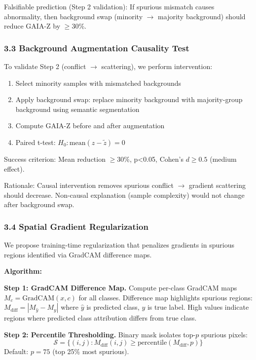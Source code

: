 Falsifiable prediction (Step 2 validation): If spurious mismatch causes abnormality, then background swap (minority $\rightarrow$ majority background) should reduce GAIA-Z by $\geq 30$\%.

\subsubsection{3.3 Background Augmentation Causality Test}

To validate Step 2 (conflict $\rightarrow$ scattering), we perform intervention:

\begin{enumerate}
\item Select minority samples with mismatched backgrounds
\item Apply background swap: replace minority background with majority-group background using semantic segmentation
\item Compute GAIA-Z before and after augmentation
\item Paired t-test: $H_0: \text{mean}(z - \tilde{z}) = 0$
\end{enumerate}

Success criterion: Mean reduction $\geq 30$\%, p<0.05, Cohen's $d\geq 0.5$ (medium effect).

Rationale: Causal intervention removes spurious conflict $\rightarrow$ gradient scattering should decrease. Non-causal explanation (sample complexity) would not change after background swap.

\subsubsection{3.4 Spatial Gradient Regularization}

We propose training-time regularization that penalizes gradients in spurious regions identified via GradCAM difference maps.

\textbf{Algorithm:}

\textbf{Step 1: GradCAM Difference Map.} Compute per-class GradCAM maps $M_c = \text{GradCAM}(x, c)$ for all classes. Difference map highlights spurious regions: $M_{\text{diff}} = |M_{\hat{y}} - M_{y}|$ where $\hat{y}$ is predicted class, $y$ is true label. High values indicate regions where predicted class attribution differs from true class.

\textbf{Step 2: Percentile Thresholding.} Binary mask isolates top-$p$ spurious pixels:  
$$\mathcal{S} = \{(i,j) : M_{\text{diff}}(i,j) \geq \text{percentile}(M_{\text{diff}}, p)\}$$  
Default: $p = 75$ (top 25\% most spurious).

